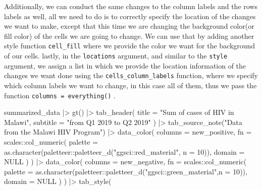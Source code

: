 \documentclass[
]{article}
\newenvironment{Shaded}{\begin{snugshade}}{\end{snugshade}}
\newcommand{\AttributeTok}[1]{\textcolor[rgb]{0.77,0.63,0.00}{#1}}
\newcommand{\ConstantTok}[1]{\textcolor[rgb]{0.00,0.00,0.00}{#1}}
\newcommand{\DecValTok}[1]{\textcolor[rgb]{0.00,0.00,0.81}{#1}}
\newcommand{\FunctionTok}[1]{\textcolor[rgb]{0.00,0.00,0.00}{#1}}
\newcommand{\NormalTok}[1]{#1}
\newcommand{\SpecialCharTok}[1]{\textcolor[rgb]{0.00,0.00,0.00}{#1}}
\newcommand{\StringTok}[1]{\textcolor[rgb]{0.31,0.60,0.02}{#1}}
\begin{document}
Additionally, we can conduct the same changes to the column labels and
the rows labels as well, all we need to do is to correctly specify the
location of the changes we want to make, except that this time we are
changing the background color(or fill color) of the cells we are going
to change. We can use that by adding another style function
\texttt{cell\_fill} where we provide the color we want for the
background of our cells. lastly, in the \texttt{locations} argument, and
similar to the \texttt{style} argument, we assign a list in which we
provide the location information of the changes we want done using the
\texttt{cells\_column\_labels} function, where we specify which column
labels we want to change, in this case all of them, thus we pass the
function \texttt{columns\ =\ everything()} .

\begin{Shaded}
\begin{Highlighting}[]
\NormalTok{summarized\_data }\SpecialCharTok{|\textgreater{}} 
  \FunctionTok{gt}\NormalTok{() }\SpecialCharTok{|\textgreater{}} 
  \FunctionTok{tab\_header}\NormalTok{(}
    \AttributeTok{title =} \StringTok{"Sum of cases of HIV in Malawi"}\NormalTok{,}
    \AttributeTok{subtitle =} \StringTok{"from Q1 2019 to Q2 2019"}
\NormalTok{  ) }\SpecialCharTok{|\textgreater{}} 
  \FunctionTok{tab\_source\_note}\NormalTok{(}\StringTok{"Data from the Malawi HIV Program"}\NormalTok{) }\SpecialCharTok{|\textgreater{}} 
  \FunctionTok{data\_color}\NormalTok{(}
    \AttributeTok{columns =}\NormalTok{ new\_positive,}
    \AttributeTok{fn =}\NormalTok{ scales}\SpecialCharTok{::}\FunctionTok{col\_numeric}\NormalTok{(}
      \AttributeTok{palette =} \FunctionTok{as.character}\NormalTok{(paletteer}\SpecialCharTok{::}\FunctionTok{paletteer\_d}\NormalTok{(}\StringTok{"ggsci::red\_material"}\NormalTok{, }\AttributeTok{n =} \DecValTok{10}\NormalTok{)),}
      \AttributeTok{domain =} \ConstantTok{NULL}
\NormalTok{    )}
\NormalTok{  ) }\SpecialCharTok{|\textgreater{}} 
  \FunctionTok{data\_color}\NormalTok{(}
    \AttributeTok{columns =}\NormalTok{ new\_negative,}
    \AttributeTok{fn =}\NormalTok{ scales}\SpecialCharTok{::}\FunctionTok{col\_numeric}\NormalTok{(}
      \AttributeTok{palette =} \FunctionTok{as.character}\NormalTok{(paletteer}\SpecialCharTok{::}\FunctionTok{paletteer\_d}\NormalTok{(}\StringTok{"ggsci::green\_material"}\NormalTok{,}\AttributeTok{n =} \DecValTok{10}\NormalTok{)),}
      \AttributeTok{domain =} \ConstantTok{NULL}
\NormalTok{    )}
\NormalTok{  ) }\SpecialCharTok{|\textgreater{}} 
  \FunctionTok{tab\_style}\NormalTok{(}

\end{Highlighting}
\end{Shaded}
\end{document}
